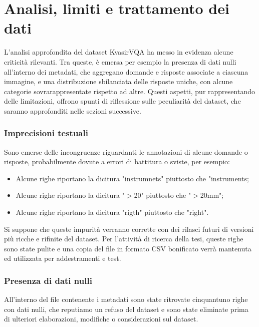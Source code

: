 \documentclass[../main.tex]{subfiles}
\begin{document}
\section{Analisi, limiti e trattamento dei dati}

L'analisi approfondita del dataset KvasirVQA ha messo in evidenza alcune criticità rilevanti. Tra queste, è emersa per esempio la presenza di dati nulli all'interno dei metadati, che aggregano domande e risposte associate a ciascuna immagine, e una distribuzione sbilanciata delle risposte uniche, con alcune categorie sovrarappresentate rispetto ad altre. 
Questi aspetti, pur rappresentando delle limitazioni, offrono spunti di riflessione sulle peculiarità del dataset, che saranno approfonditi nelle sezioni successive.

\subsubsection{Imprecisioni testuali}

Sono emerse delle incongruenze riguardanti le annotazioni di alcune domande o risposte, probabilmente dovute a errori di battitura o sviste, per esempio:

\begin{itemize}
    \item Alcune righe riportano la dicitura "instrumnets" piuttosto che "instruments;
    \item Alcune righe riportano la dicitura "$>$20" piuttosto che "$>$20mm";
    \item Alcune righe riportano la dicitura "rigth" piuttosto che "right".
\end{itemize}

Si suppone che queste impurità verranno corrette con dei rilasci futuri di versioni più ricche e rifinite del dataset. 
Per l'attività di ricerca della tesi, queste righe sono state pulite e una copia del file in formato CSV bonificato verrà mantenuta ed utilizzata per addestramenti e test.

\subsubsection{Presenza di dati nulli}

All'interno del file contenente i metadati sono state ritrovate cinquantuno righe con dati nulli, che reputiamo un refuso del dataset e sono state eliminate prima di ulteriori elaborazioni, modifiche o considerazioni sul dataset. 
\end{document}
